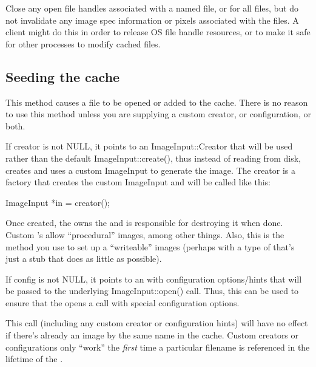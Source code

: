 Close any open file handles associated with a named file, or for all
files, but do not invalidate any image spec information or pixels
associated with the files.  A client might do this in order to
release OS file handle resources, or to make it safe for other
processes to modify cached files.
\apiend

\subsection{Seeding the cache}
\label{sec:imagecache:api:seeding}
This method causes a file to be opened or added to the
cache. There is no reason to use this method unless you are supplying
a custom creator, or configuration, or both.

If {\cf creator} is not NULL, it points to an {\cf ImageInput::Creator} that
will be used rather than the default {\cf ImageInput::create()}, thus
instead of reading from disk, creates and uses a custom ImageInput
to generate the image. The {\cf creator} is a factory that creates the
custom ImageInput and will be called like this:
\begin{code}
    ImageInput *in = creator();
\end{code}
Once created, the \ImageCache owns the \ImageInput and is responsible
for destroying it when done. Custom \ImageInput's allow ``procedural''
images, among other things.  Also, this is the method you use to set
up a ``writeable'' \ImageCache images (perhaps with a type of
\ImageInput that's just a stub that does as little as possible).

If {\cf config} is not NULL, it points to an \ImageSpec with configuration
options/hints that will be passed to the underlying
{\cf ImageInput::open()} call. Thus, this can be used to ensure that the
\ImageCache opens a call with special configuration options.

This call (including any custom creator or configuration hints) will
have no effect if there's already an image by the same name in the
cache. Custom creators or configurations only ``work'' the \emph{first} time
a particular filename is referenced in the lifetime of the
\ImageCache.
\apiend

